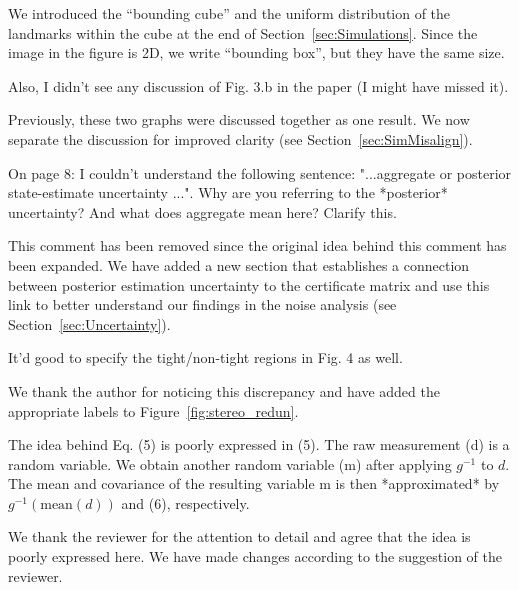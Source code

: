 \begin{response}
We introduced the ``bounding cube'' and the uniform distribution of the landmarks within the cube at the end of Section~\ref{sec:Simulations}. Since the image in the figure is 2D, we write ``bounding box'', but they have the same size.
\end{response}

Also, I didn't see any discussion of Fig. 3.b in the paper (I might have missed it). 

\begin{response}
Previously, these two graphs were discussed together as one result. We now separate the discussion for improved clarity (see Section~\ref{sec:SimMisalign}).
\end{response}

On page 8: I couldn't understand the following sentence: "...aggregate or posterior state-estimate uncertainty ...". Why are you referring to the *posterior* uncertainty? And what does aggregate mean here? Clarify this. 
\begin{response}
This comment has been removed since the original idea behind this comment has been expanded. We have added a new section that establishes a connection between posterior estimation uncertainty to the certificate matrix and use this link to better understand our findings in the noise analysis (see Section~\ref{sec:Uncertainty}).
\end{response}

It'd good to specify the tight/non-tight regions in Fig. 4 as well. 
\begin{response}
We thank the author for noticing this discrepancy and have added the appropriate labels to Figure~\ref{fig:stereo_redun}.
\end{response}

The idea behind Eq. (5) is poorly expressed in (5). The raw measurement (d) is a random variable. We obtain another random variable (m) after applying $g^{-1}$ to $d$. The mean and covariance of the resulting variable m is then *approximated* by $g^{-1}(\mbox{mean}(d))$ and (6), respectively. 
\begin{response}
We thank the reviewer for the attention to detail and agree that the idea is poorly expressed here. We have made changes according to the suggestion of the reviewer. 
\end{response}

